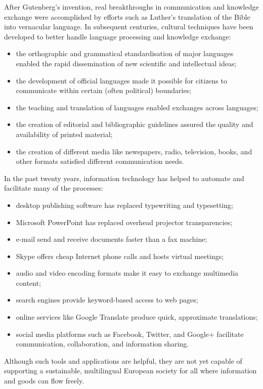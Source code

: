 \documentclass[]{../../metanetpaper}
\begin{document}
\begin{Parallel}[c]{80mm}{80mm}
{    After Gutenberg’s invention, real breakthroughs in communication and knowledge exchange were accomplished by efforts such as Luther’s translation of the Bible into vernacular language. In subsequent centuries, cultural techniques have been developed to better handle language processing and knowledge exchange:
    \begin{itemize}
      \item the orthographic and grammatical standardisation of major languages enabled the rapid dissemination of new 
      scientific and intellectual ideas;
      \item the development of official languages made it possible for citizens to communicate within certain (often 
      political) boundaries;
      \item the teaching and translation of languages enabled exchanges across languages;
      \item the creation of editorial and bibliographic guidelines assured the quality and availability of printed 
      material;
      \item the creation of different media like newspapers, radio, television, books, and other formats satisfied 
      different communication needs. 
    \end{itemize}
    In the past twenty years, information technology has helped to automate and facilitate many of the processes:
    \begin{itemize}
      \item desktop publishing software has replaced typewriting and typesetting;
      \item Microsoft PowerPoint has replaced overhead projector transparencies;
      \item e-mail send and receive documents faster than a fax machine;
      \item Skype offers cheap Internet phone calls and hosts virtual meetings;
      \item audio and video encoding formats make it easy to exchange multimedia content;
      \item search engines provide keyword-based access to web pages;
      \item online services like Google Translate produce quick, approximate translations;
      \item social media platforms such as Facebook, Twitter, and Google+ facilitate communication, collaboration, and information sharing.
    \end{itemize}
    Although such tools and applications are helpful, they are not yet capable of supporting a sustainable, multilingual European society for all where information and goods can flow freely.
  }
  \ParallelPar



\end{Parallel}
\end{document}
